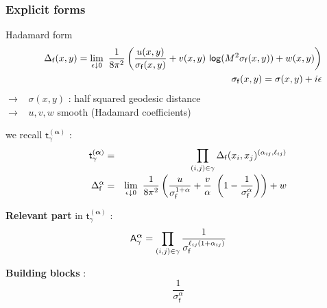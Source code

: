 \documentclass[9pt]{beamer}
\renewcommand{\log}{\mathsf{log}}
\newcommand{\alphabd}{\boldsymbol{\alpha}}
\newcommand{\Asf}{\mathsf{A}}
\newcommand{\fsf}{\mathsf{f}}
\newcommand{\tsf}{\mathsf{t}}
\begin{document}

\begin{frame}

\frametitle{Explicit forms}

\vfill

\begin{block}{Hadamard form}
\vspace*{-25pt}
\begin{eqnarray*}
&& \Delta_\fsf(x,y) = \lim_{\epsilon \downarrow 0} \ \frac{1}{8\pi^2}\left(\frac{u(x,y)}{\sigma_\fsf(x,y)}+v(x,y) \ \log(M^2 \sigma_\fsf(x,y))+w(x,y)\right)  \\
&& \sigma_\fsf(x,y) = \sigma(x,y) + i\epsilon 
\vspace*{-8pt}
\end{eqnarray*}
$\to$ \ $\sigma(x,y)$ : half squared geodesic distance \\ 
$\to$ \ $u,v,w$ smooth (Hadamard coefficients)
\end{block}

\vfill

we recall $\tsf_\gamma^{(\alphabd)}$ :
%
\vspace*{-20.5pt}
\begin{eqnarray*}
\qquad \tsf^{(\alphabd)}_\gamma &=& \prod_{(i,j) \in \gamma} \Delta_\fsf(x_i,x_j)^{(\alpha_{ij},\ell_{ij})} \\[-2pt]
\qquad \Delta_\fsf^\alpha &=& \lim_{\epsilon \downarrow 0} \ \frac{1}{8\pi^2}\left(\frac{u}{\sigma_\fsf^{1+\alpha}} + \frac{v}{\alpha} \ \left( 1 - \frac{1}{\sigma_\fsf^\alpha}\right) \right) + w  
\vspace*{-5pt}
\end{eqnarray*}

\vfill

\textbf{Relevant part} in $\tsf_\gamma^{(\alphabd)}$ :
%
\vspace*{-5pt}
\begin{equation*}
\Asf_\gamma^{\alphabd} = \prod_{(i,j)\in\gamma} \frac{1}{\sigma_\fsf^{\ell_{ij}(1+\alpha_{ij})}}
\vspace*{-7pt}
\end{equation*}

\vfill

\textbf{Building blocks} :
%
\vspace*{-5pt}
\begin{equation*}
\frac{1}{\sigma_\fsf^\alpha}
\end{equation*}

\vfill

\end{frame}
\end{document}
